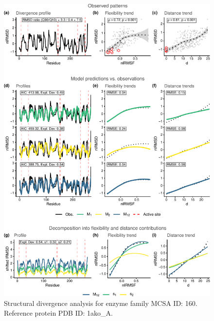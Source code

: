 \documentclass[
]{article}
\begin{document}
\clearpage
\begin{figure}[H]
\centering


\begin{center}\includegraphics{supplementary_material_files/figure-latex/generate_figures-8} \end{center}

\caption{Structural divergence analysis for enzyme family MCSA ID: 160. Reference protein PDB ID: 1ako\_A.}
\end{figure}
\end{document}
